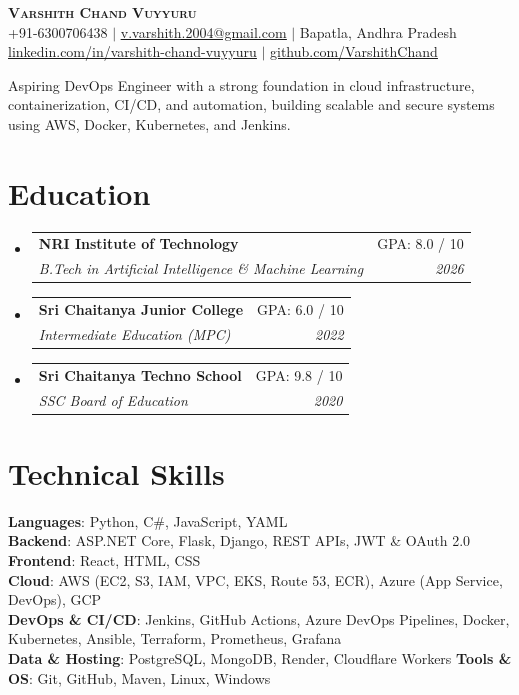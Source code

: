\documentclass[letterpaper,11pt]{article}
\makeatletter
\newcommand{\resumeSubheading}[4]{
  \vspace{-2pt}\item
    \begin{tabular*}{0.97\textwidth}[t]{l@{\extracolsep{\fill}}r}
      \textbf{#1} & #2 \\
      \textit{\small#3} & \textit{\small #4} \\
    \end{tabular*}\vspace{-7pt}
}
\newcommand{\resumeSubHeadingListStart}{\begin{itemize}[leftmargin=0.15in, label={}]}
\newcommand{\resumeSubHeadingListEnd}{\end{itemize}}
\makeatother
\begin{document}
\begin{center}
    \textbf{\Huge \scshape Varshith Chand Vuyyuru} \\ \vspace{1pt}
    \small +91-6300706438 $|$ \href{mailto:v.varshith.2004@gmail.com}{\underline{v.varshith.2004@gmail.com}} $|$
    Bapatla, Andhra Pradesh \\ \vspace{1pt}
    \small \href{https://linkedin.com/in/varshith-chand-vuyyuru}{\underline{linkedin.com/in/varshith-chand-vuyyuru}} $|$
    \href{https://github.com/VarshithChand}{\underline{github.com/VarshithChand}}
\end{center}

\small{Aspiring DevOps Engineer with a strong foundation in cloud infrastructure, containerization, CI/CD,
and automation, building scalable and secure systems using AWS, Docker, Kubernetes, and Jenkins.} \\[4pt]

\section{Education}
  \resumeSubHeadingListStart
    \resumeSubheading
      {NRI Institute of Technology}{GPA: 8.0 / 10}
      {B.Tech in Artificial Intelligence \& Machine Learning}{2026}
    \resumeSubheading
      {Sri Chaitanya Junior College}{GPA: 6.0 / 10}
      {Intermediate Education (MPC)}{2022}
    \resumeSubheading
      {Sri Chaitanya Techno School}{GPA: 9.8 / 10}
      {SSC Board of Education}{2020}
  \resumeSubHeadingListEnd

\section{Technical Skills}
 \begin{itemize}[leftmargin=0.15in, label={}]
    \small{\item{
     \textbf{Languages}{: Python, C\#, JavaScript, YAML} \\
     \textbf{Backend}{: ASP.NET Core, Flask, Django, REST APIs, JWT \& OAuth 2.0} \quad
     \textbf{Frontend}{: React, HTML, CSS} \\
     \textbf{Cloud}{: AWS (EC2, S3, IAM, VPC, EKS, Route 53, ECR), Azure (App Service, DevOps), GCP} \\
     \textbf{DevOps \& CI/CD}{: Jenkins, GitHub Actions, Azure DevOps Pipelines, Docker, Kubernetes, Ansible, Terraform, Prometheus, Grafana} \\
     \textbf{Data \& Hosting}{: PostgreSQL, MongoDB, Render, Cloudflare Workers} \quad
     \textbf{Tools \& OS}{: Git, GitHub, Maven, Linux, Windows}
    }}
 \end{itemize}
\end{document}
